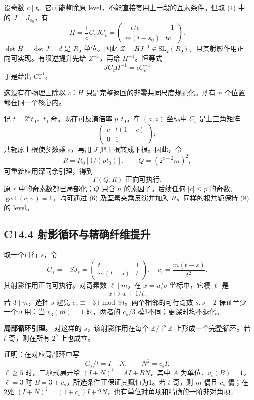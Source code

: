 {设奇数} \(c\mid t\){。它可能整除原} {level，不能直接套用上一段的互素条件。但取} {(4)} {中的} \(J=J_{s_0}\){，有} \[
H=\frac1c C_cJC_c
=\begin{pmatrix}-t/c&-1\\m(t-s_0)&tc\end{pmatrix}.
\] \(\det H=\det J=d\) {是} \(R_0\) {单位。因此} \(Z=HJ^{-1}\in\mathrm{SL}_2(R_0)\){，且其射影作用正向可实现。有限逆提升先给} \(Z^{-1}\){，再给} \(H^{-1}\){。恒等式} \[
JC_cH^{-1}=cC_c^{-1}\tag{C14.7}
\] {于是给出} \(C_c^{-1}\){。}

{这没有在物理上除以} \(c\){：}\(H\) {只是完整返回的非零共同尺度规范化。所有} \(n\) {个位置都在同一个核心内。}

{记} \(t=2^a t_0\){，}\(t_0\) {奇。现在可反演倍率} \(p,t_0\){。在} \((a,z)\) {坐标中} \(C_c\) {是上三角矩阵} \[
\begin{pmatrix}c&t(1-c)\\0&1\end{pmatrix};
\] {共轭原上根使参数乘} \(c\){，再用} \(J\) {把上根转成下根。因此，令} \[
R=R_0[1/(pt_0)],\qquad Q=(2^{a+2}m)^2,
\] {可重新应用深同余引理，得到} \[
\boxed{\Gamma(Q,R)\text{ 正向可执行}.}\tag{C14.8}
\] {原} \(r\) {中的奇素数都已局部化；}\(Q\) {只含} \(n\) {的素因子。后续任何} \(|c|\le p\) {的奇数、}\(\gcd(c,n)=1\){，均可通过} {(6)} {及互素夹乘反演并加入} \(R\){。同样的根共轭保持} {(8)} {的} {level。}

\subsection*{\texorpdfstring{{C14.4} {射影循环与精确纤维提升}}{C14.4 射影循环与精确纤维提升}}\label{C14-h96}

{取一个可行} \(s\){，令} \[
G_s=-SJ_s=\begin{pmatrix}t&1\\m(t-s)&t\end{pmatrix},
\quad c_s=\frac{m(t-s)}{t^2}.
\] {其射影作用正向可执行。对奇素数} \(\ell\mid m\){，在} \(x=u/v\) {坐标中，它模} \(\ell\) {是} \[
x\mapsto x+1/t.
\] {若} \(3\mid m\){，选择} \(s\) {避免} \(c_s\equiv-3\pmod9\){。两个相邻的可行奇数} \(s,s-2\) {保证至少一个可用：当} \(v_3(m)=1\) {时，两者的} \(c_s/3\) {模3不同；更深时均不退化。}

\textbf{{局部循环引理。}} {对这样的} \(s\){，该射影作用在每个} \(\mathbb Z/\ell^b\mathbb Z\) {上形成一个完整循环。若} \(t\) {奇，则在所有} \(2^b\) {上也成立。}

{证明：在对应局部环中写} \[
G_s/t=I+N,\qquad N^2=c_s I.
\] \(\ell\ge5\) {时，二项式展开给} \((I+N)^\ell=A I+B N\){，其中} \(A\) {为单位、}\(v_\ell(B)=1\){。}\(\ell=3\) {时} \(B=3+c_s\){，所选条件正保证其赋值为1。若} \(t\) {奇，则} \(m\) {偶且} \(c_s\) {偶；在2处} \((I+N)^2=(1+c_s)I+2N\){，也有单位对角项和精确的一阶非对角项。}

